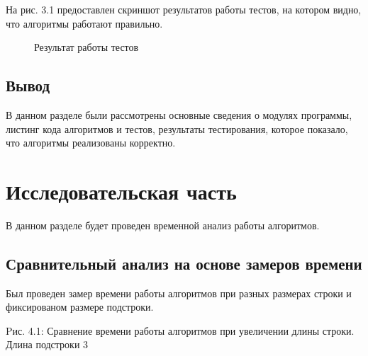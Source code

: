 \documentclass[12pt]{report}
\begin{document}
На рис. 3.1 предоставлен скриншот результатов работы тестов, на котором видно, что алгоритмы работают правильно.

\begin{figure}[h]
	\caption{Результат работы тестов}
	\label{fig:v_st}
\end{figure}


\section*{Вывод}
В данном разделе были рассмотрены основные сведения о модулях программы, листинг кода алгоритмов и тестов, результаты тестирования,
которое показало,  что алгоритмы реализованы корректно.


\chapter{Исследовательская часть}
В данном разделе будет проведен временной анализ работы алгоритмов.

\section{Сравнительный анализ на основе замеров времени}
Был проведен замер времени работы алгоритмов при разных размерах строки и фиксированом размере подстроки.

\begin{center}
Pис. 4.1: Сравнение времени работы алгоритмов при увеличении длины строки. Длина подстроки 3
\end{center}
\end{document}
